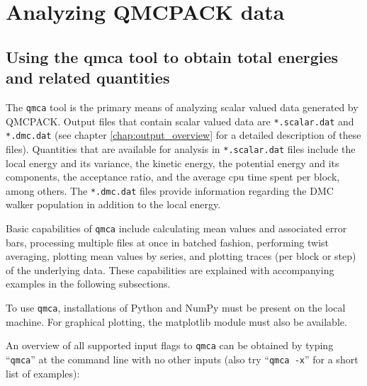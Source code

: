 \chapter{Analyzing QMCPACK data}
\label{chap:analyzing}

\section{Using the qmca tool to obtain total energies and related quantities}
\label{sec:qmca}

The \texttt{qmca} tool is the primary means of analyzing scalar valued 
data generated by QMCPACK.  Output files that contain scalar valued data 
are \texttt{*.scalar.dat} and \texttt{*.dmc.dat} (see chapter 
\ref{chap:output_overview} for a detailed description of these files).
Quantities that are available for analysis in \texttt{*.scalar.dat} files 
include the local energy and its variance, the kinetic energy, 
the potential energy and its components,
the acceptance ratio, and the average cpu time spent per block, among 
others.  The \texttt{*.dmc.dat} files provide information regarding 
the DMC walker population in addition to the local energy.  

Basic capabilities of \texttt{qmca} include calculating mean values 
and associated error bars, processing multiple files at once in batched 
fashion, performing twist averaging, plotting mean values by series, 
and plotting traces (per block or step) of the underlying data.  
These capabilities are explained with accompanying examples in the 
following subsections.

To use \texttt{qmca}, installations of Python and NumPy must be 
present on the local machine.  For graphical plotting, the matplotlib module 
must also be available.

An overview of all supported input flags to \texttt{qmca} can be 
obtained by typing ``\texttt{qmca}'' at the command line with no 
other inputs (also try ``\texttt{qmca -x}'' for a short list of examples):

